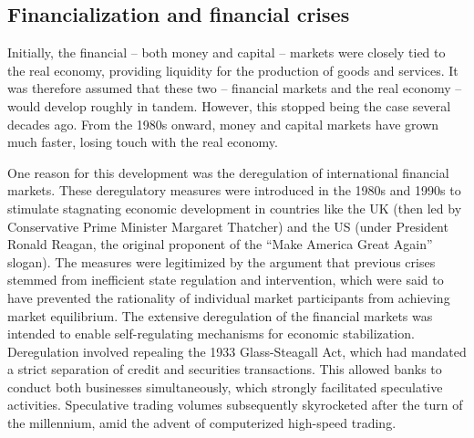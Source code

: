 \documentclass[
  a4paper,
  openany]{book}
\begin{document}
\subsection{Financialization and financial
crises}\label{financialization-and-financial-crises}

Initially, the financial -- both money and capital -- markets were
closely tied to the real economy, providing liquidity for the production
of goods and services. It was therefore assumed that these two --
financial markets and the real economy -- would develop roughly in
tandem. However, this stopped being the case several decades ago. From
the 1980s onward, money and capital markets have grown much faster,
losing touch with the real economy.

One reason for this development was the deregulation of international
financial markets. These deregulatory measures were introduced in the
1980s and 1990s to stimulate stagnating economic development in
countries like the UK (then led by Conservative Prime Minister Margaret
Thatcher) and the US (under President Ronald Reagan, the original
proponent of the ``Make America Great Again'' slogan). The measures were
legitimized by the argument that previous crises stemmed from
inefficient state regulation and intervention, which were said to have
prevented the rationality of individual market participants from
achieving market equilibrium. The extensive deregulation of the
financial markets was intended to enable self-regulating mechanisms for
economic stabilization. Deregulation involved repealing the 1933
Glass-Steagall Act, which had mandated a strict separation of credit and
securities transactions. This allowed banks to conduct both businesses
simultaneously, which strongly facilitated speculative activities.
Speculative trading volumes subsequently skyrocketed after the turn of
the millennium, amid the advent of computerized high-speed trading.
\end{document}
